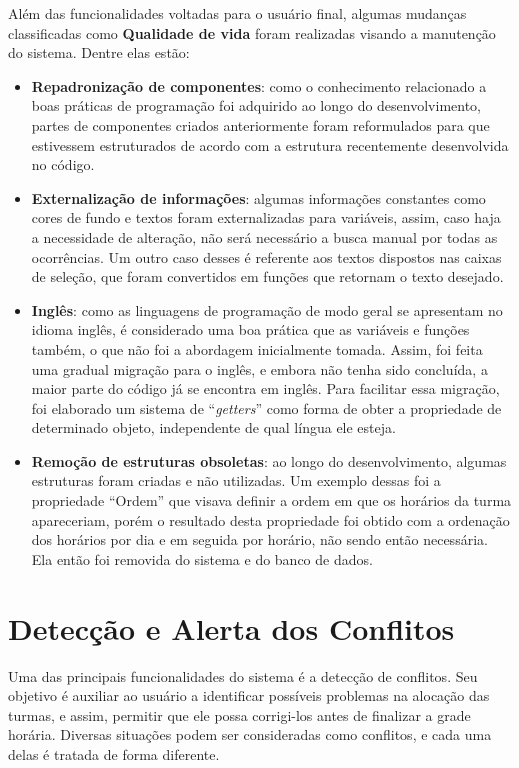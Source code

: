Além das funcionalidades voltadas para o usuário final, algumas mudanças classificadas como \textbf{Qualidade de vida} foram realizadas visando a manutenção do sistema. Dentre elas estão:

\begin{itemize}
  \item \textbf{Repadronização de componentes}: como o conhecimento relacionado a boas práticas de programação foi adquirido ao longo do desenvolvimento, partes de componentes criados anteriormente foram reformulados para que estivessem estruturados de acordo com a estrutura recentemente desenvolvida no código.
  \item \textbf{Externalização de informações}: algumas informações constantes como cores de fundo e textos foram externalizadas para variáveis, assim, caso haja a necessidade de alteração, não será necessário a busca manual por todas as ocorrências. Um outro caso desses é referente aos textos dispostos nas caixas de seleção, que foram convertidos em funções que retornam o texto desejado.
  \item \textbf{Inglês}: como as linguagens de programação de modo geral se apresentam no idioma inglês, é considerado uma boa prática que as variáveis e funções também, o que não foi a abordagem inicialmente tomada. Assim, foi feita uma gradual migração para o inglês, e embora não tenha sido concluída, a maior parte do código já se encontra em inglês. Para facilitar essa migração, foi elaborado um sistema de ``\textit{getters}'' como forma de obter a propriedade de determinado objeto, independente de qual língua ele esteja.
  \item \textbf{Remoção de estruturas obsoletas}: ao longo do desenvolvimento, algumas estruturas foram criadas e não utilizadas. Um exemplo dessas foi a propriedade ``Ordem'' que visava definir a ordem em que os horários da turma apareceriam, porém o resultado desta propriedade foi obtido com a ordenação dos horários por dia e em seguida por horário, não sendo então necessária. Ela então foi removida do sistema e do banco de dados.
\end{itemize}

\section{Detecção e Alerta dos Conflitos} \label{sec:conflitos} %

Uma das principais funcionalidades do sistema é a detecção de conflitos. Seu objetivo é auxiliar ao usuário a identificar possíveis problemas na alocação das turmas, e assim, permitir que ele possa corrigi-los antes de finalizar a grade horária. Diversas situações podem ser consideradas como conflitos, e cada uma delas é tratada de forma diferente.

